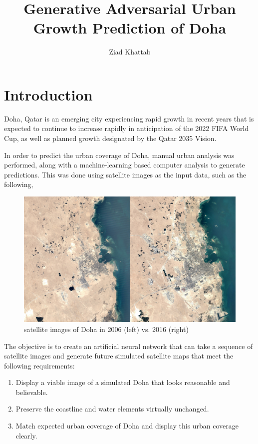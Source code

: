 \documentclass{article}
\title{\huge{Generative Adversarial Urban Growth Prediction of Doha}}
\author{Ziad Khattab}
\date{}
\begin{document}
\maketitle

\section{Introduction}

Doha, Qatar is an emerging city experiencing rapid growth in recent years that is expected to continue to increase rapidly in anticipation of the 2022 FIFA World Cup, as well as planned growth designated by the Qatar 2035 Vision.

In order to predict the urban coverage of Doha, manual urban analysis was performed, along with a machine-learning based computer analysis to generate predictions. This was done using satellite images as the input data, such as the following,

\begin{figure}[H]
    \caption{satellite images of Doha in 2006 (left) vs. 2016 (right)}
    \centering
    \includegraphics[width=0.7\linewidth]{2006-2016-comp.png}
\end{figure}

The objective is to create an artificial neural network that can take a sequence of satellite images and generate future simulated satellite maps that meet the following requirements:
\begin{enumerate}[label=(\alph*)]
    \item Display a viable image of a simulated Doha that looks reasonable and believable.
    \item Preserve the coastline and water elements virtually unchanged.
    \item Match expected urban coverage of Doha and display this urban coverage clearly.
\end{enumerate}

\clearpage
\end{document}
